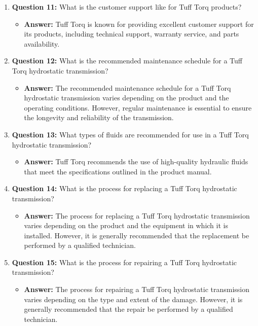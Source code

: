 \documentclass{article}
\begin{document}
\begin{enumerate}
    \item \textbf{Question 11:} What is the customer support like for Tuff Torq products?
    \begin{itemize}
        \item \textbf{Answer:} Tuff Torq is known for providing excellent customer support for its products, including technical support, warranty service, and parts availability.
    \end{itemize}
    
    \item \textbf{Question 12:} What is the recommended maintenance schedule for a Tuff Torq hydrostatic transmission?
    \begin{itemize}
        \item \textbf{Answer:} The recommended maintenance schedule for a Tuff Torq hydrostatic transmission varies depending on the product and the operating conditions. However, regular maintenance is essential to ensure the longevity and reliability of the transmission.
    \end{itemize}
    
    \item \textbf{Question 13:} What types of fluids are recommended for use in a Tuff Torq hydrostatic transmission?
    \begin{itemize}
        \item \textbf{Answer:} Tuff Torq recommends the use of high-quality hydraulic fluids that meet the specifications outlined in the product manual.
    \end{itemize}
    
    \item \textbf{Question 14:} What is the process for replacing a Tuff Torq hydrostatic transmission?
    \begin{itemize}
        \item \textbf{Answer:} The process for replacing a Tuff Torq hydrostatic transmission varies depending on the product and the equipment in which it is installed. However, it is generally recommended that the replacement be performed by a qualified technician.
    \end{itemize}
    
    \item \textbf{Question 15:} What is the process for repairing a Tuff Torq hydrostatic transmission?
    \begin{itemize}
        \item \textbf{Answer:} The process for repairing a Tuff Torq hydrostatic transmission varies depending on the type and extent of the damage. However, it is generally recommended that the repair be performed by a qualified technician.
    \end{itemize}
    

\end{enumerate}
\end{document}
